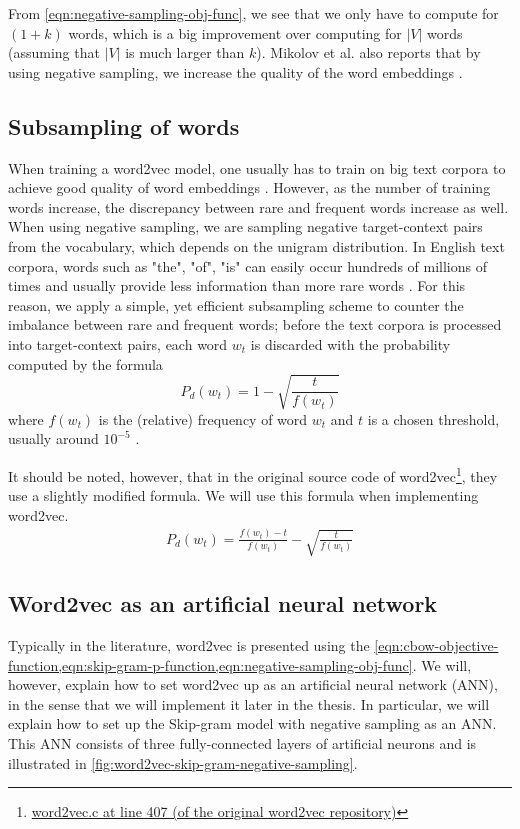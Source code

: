 From \cref{eqn:negative-sampling-obj-func}, we see that we only have to compute for $(1 + k)$ words, which is a big improvement over computing for $|V|$ words (assuming that $|V|$ is much larger than $k$). Mikolov et al. also reports that by using negative sampling, we increase the quality of the word embeddings \cite{mikolov2013b}.

\subsection{Subsampling of words}
When training a word2vec model, one usually has to train on big text corpora to achieve good quality of word embeddings \cite{mikolov2013a}. However, as the number of training words increase, the discrepancy between rare and frequent words increase as well. When using negative sampling, we are sampling negative target-context pairs from the vocabulary, which depends on the unigram distribution. In English text corpora, words such as "the", "of", "is" can easily occur hundreds of millions of times and usually provide less information than more rare words \cite{mikolov2013b}. For this reason, we apply a simple, yet efficient subsampling scheme to counter the imbalance between rare and frequent words; before the text corpora is processed into target-context pairs, each word $w_t$ is discarded with the probability computed by the formula \cite{mikolov2013b, levy-etal-2015-improving}
\begin{equation}
    P_d(w_t) = 1 - \sqrt{\frac{t}{f(w_t)}}
\end{equation}
where $f(w_t)$ is the (relative) frequency of word $w_t$ and $t$ is a chosen threshold, usually around $10^{-5}$ \cite{mikolov2013b}.

It should be noted, however, that in the original source code of word2vec\footnote{\href{https://github.com/tmikolov/word2vec/blob/e092540633572b883e25b367938b0cca2cf3c0e7/word2vec.c\#L407}{word2vec.c at line 407 (of the original word2vec repository)}}, they use a slightly modified formula. We will use this formula when implementing word2vec.
\begin{align}
    P_d(w_t) = \frac{f(w_t) - t}{f(w_t)} - \sqrt{\frac{t}{f(w_t)}}
\end{align}

\subsection{Word2vec as an artificial neural network}
\label{sec:word2vec-as-an-ann}
Typically in the literature, word2vec is presented using the \cref{eqn:cbow-objective-function,eqn:skip-gram-p-function,eqn:negative-sampling-obj-func}. We will, however, explain how to set word2vec up as an artificial neural network (ANN), in the sense that we will implement it later in the thesis. In particular, we will explain how to set up the Skip-gram model with negative sampling as an ANN. This ANN consists of three fully-connected layers of artificial neurons \cite{rong2016word2vec} and is illustrated in \cref{fig:word2vec-skip-gram-negative-sampling}.


